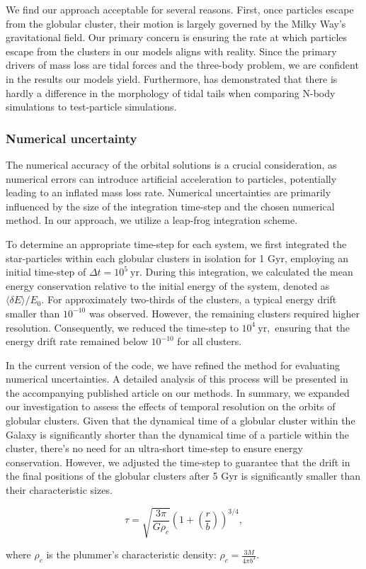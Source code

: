We find our approach acceptable for several reasons. First, once particles escape from the globular cluster, their motion is largely governed by the Milky Way's gravitational field. Our primary concern is ensuring the rate at which particles escape from the clusters in our models aligns with reality. Since the primary drivers of mass loss are tidal forces and the three-body problem, we are confident in the results our models yield. Furthermore, \citet{2012A&A...546L...7M} has demonstrated that there is hardly a difference in the morphology of tidal tails when comparing N-body simulations to test-particle simulations.

\subsubsection*{Numerical uncertainty}

The numerical accuracy of the orbital solutions is a crucial consideration, as numerical errors can introduce artificial acceleration to particles, potentially leading to an inflated mass loss rate. Numerical uncertainties are primarily influenced by the size of the integration time-step and the chosen numerical method. In our approach, we utilize a leap-frog integration scheme.

To determine an appropriate time-step for each system, we first integrated the star-particles within each globular clusters in isolation for 1 Gyr, employing an initial time-step of $\Delta t = 10^5~\mathrm{yr}$. During this integration, we calculated the mean energy conservation relative to the initial energy of the system, denoted as $\langle\delta E\rangle/E_0$. For approximately two-thirds of the clusters, a typical energy drift smaller than $10^{-10}$ was observed. However, the remaining clusters required higher resolution. Consequently, we reduced the time-step to $10^4~\mathrm{yr},$ ensuring that the energy drift rate remained below $10^{-10}$ for all clusters.

In the current version of the code, we have refined the method for evaluating numerical uncertainties. A detailed analysis of this process will be presented in the accompanying published article on our methods. In summary, we expanded our investigation to assess the effects of temporal resolution on the orbits of globular clusters. Given that the dynamical time of a globular cluster within the Galaxy is significantly shorter than the dynamical time of a particle within the cluster, there's no need for an ultra-short time-step to ensure energy conservation. However, we adjusted the time-step to guarantee that the drift in the final positions of the globular clusters after 5 Gyr is significantly smaller than their characteristic sizes.


\begin{equation}
    \tau = \sqrt{\frac{3\pi}{G\rho_c}} \left(1+\left(\frac{r}{b}\right)\right)^{3/4},
\end{equation}

where $\rho_c$ is the plummer's characteristic density: $\rho_c = \frac{3M}{4\pi b^3}$.
